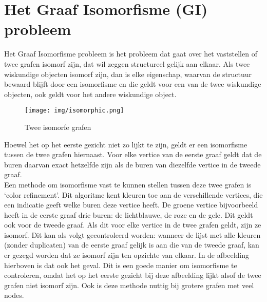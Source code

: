 \documentclass{article}
\begin{document}


\renewcommand*\contentsname{Inhoudsopgave}
\tableofcontents{}
\pagebreak


\section{Het Graaf Isomorfisme (GI) probleem}

Het Graaf Isomorfisme probleem is het probleem dat gaat over het vaststellen of twee grafen isomorf zijn, dat wil zeggen structureel gelijk aan elkaar. Als twee wiskundige objecten isomorf zijn, dan is elke eigenschap, waarvan de structuur bewaard blijft door een isomorfisme en die geldt voor een van de twee wiskundige objecten, ook geldt voor het andere wiskundige object.\\

\begin{wrapfigure}{r}{0.5\textwidth}
\begin{center}
\texttt{[image: img/isomorphic.png]}
\end{center}
\caption{Twee isomorfe grafen}
\end{wrapfigure}

Hoewel het op het eerste gezicht niet zo lijkt te zijn, geldt er een isomorfisme tussen de twee grafen hiernaast. Voor elke vertice van de eerste graaf geldt dat de buren daarvan exact hetzelfde zijn als de buren van diezelfde vertice in de tweede graaf.\\

Een methode om isomorfisme vast te kunnen stellen tussen deze twee grafen is ‘color refinement’. Dit algoritme kent kleuren toe aan de verschillende vertices, die een indicatie geeft welke buren deze vertice heeft. De groene vertice bijvoorbeeld heeft in de eerste graaf drie buren: de lichtblauwe, de roze en de gele. Dit geldt ook voor de tweede graaf. Als dit voor elke vertice in de twee grafen geldt, zijn ze isomorf. Dit kan als volgt gecontroleerd worden: wanneer de lijst met alle kleuren (zonder duplicaten) van de eerste graaf gelijk is aan die van de tweede graaf, kan er gezegd worden dat ze isomorf zijn ten opzichte van elkaar. In de afbeelding hierboven is dat ook het geval.
Dit is een goede manier om isomorfisme te controleren, omdat het op het eerste gezicht bij deze afbeelding lijkt alsof de twee grafen niet isomorf zijn. Ook is deze methode nuttig bij grotere grafen met veel nodes.
\end{document}
